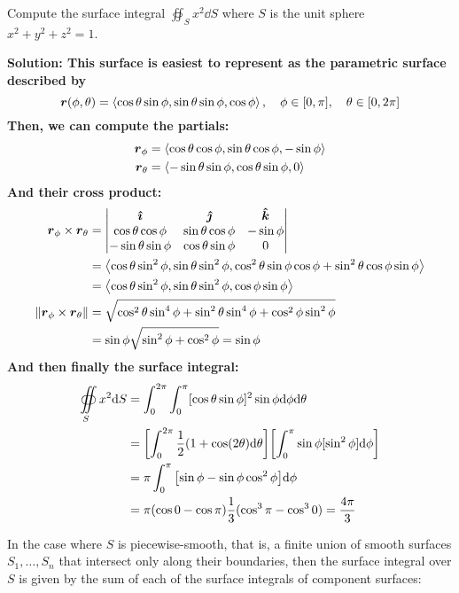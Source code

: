 \begin{example}
    Compute the surface integral $\oiint_S x^2\dd S$ where $S$ is the unit sphere $x^2+y^2+z^2=1$. \par
    \bf{Solution:} This surface is easiest to represent as the parametric surface described by
    \[ \boldsymbol{r}(\phi, \theta) = \left\langle\cos\theta\sin\phi, \sin\theta\sin\phi, \cos\phi\right\rangle, \quad \phi\in[0, \pi],\quad \theta\in[0,2\pi]\]
    Then, we can compute the partials:
    \begin{align*}
        \boldsymbol{r}_\phi &= \left\langle \cos\theta\cos\phi, \sin\theta\cos\phi, -\sin\phi\right\rangle \\
        \boldsymbol{r}_\theta &= \left\langle -\sin\theta\sin\phi, \cos\theta\sin\phi, 0\right\rangle
    \end{align*}
    And their cross product:
    \begin{align*}
        \boldsymbol{r}_\phi \times \boldsymbol{r}_\theta &= \begin{vmatrix} \boldsymbol{\hat{\imath}} & \boldsymbol{\hat{\jmath}} & \boldsymbol{\hat{k}} \\ \cos\theta\cos\phi & \sin\theta\cos\phi & -\sin\phi \\ -\sin\theta\sin\phi & \cos\theta\sin\phi & 0\end{vmatrix} \\
        &= \left\langle \cos\theta\sin^2\phi, \sin\theta\sin^2\phi, \cos^2\theta\sin\phi\cos\phi + \sin^2\theta\cos\phi\sin\phi\right\rangle \\
        &=  \left\langle \cos\theta\sin^2\phi, \sin\theta\sin^2\phi, \cos\phi\sin\phi\right\rangle \\
        \norm{\boldsymbol{r}_\phi \times \boldsymbol{r}_\theta} &= \sqrt{\cos^2\theta\sin^4\phi + \sin^2\theta\sin^4\phi + \cos^2\phi\sin^2\phi} \\
        &= \sin\phi \sqrt{\sin^2\phi + \cos^2\phi} = \sin\phi
    \end{align*}
    And then finally the surface integral:
    \begin{align*}
        \oiint\limits_S x^2\dd S &= \int_0^{2\pi}\int_0^\pi [\cos\theta\sin\phi]^2\sin\phi \dd \phi \dd \theta \\
        &= \bqty{\int_0^{2\pi} \frac{1}{2}(1+\cos(2\theta)\dd \theta}\bqty{\int_0^\pi\sin\phi [\sin^2\phi]\dd \phi } \\
        &= \pi\int_0^\pi\bqty{ \sin\phi - \sin\phi\cos^2\phi}\dd \phi \\
        &= \pi (\cos 0 - \cos \pi)\frac{1}{3}(\cos^3\pi - \cos^30) = \frac{4\pi}{3} 
    \end{align*}
\end{example}
In the case where $S$ is piecewise-smooth, that is, a finite union of smooth surfaces $S_1, \dots, S_n$ that intersect only along their boundaries, then the surface integral over $S$ is given by the sum of each of the surface integrals of component surfaces:
